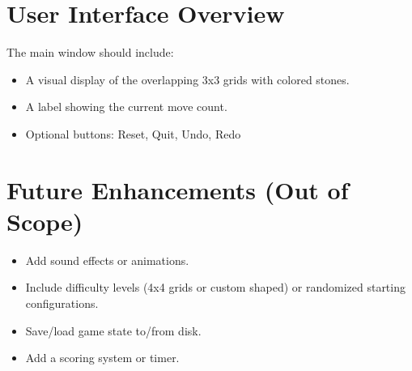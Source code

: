 \documentclass[11.5pt, oneside]{scrartcl}
\begin{document}
	\section{User Interface Overview}
	
	The main window should include:
	\begin{itemize}[noitemsep]
		\item A visual display of the overlapping 3x3 grids with colored stones.
		\item A label showing the current move count.
		\item Optional buttons: Reset, Quit, Undo, Redo
	\end{itemize}
	
	\section{Future Enhancements (Out of Scope)}
	
	\begin{itemize}[noitemsep]
		\item Add sound effects or animations.
		\item Include difficulty levels (4x4 grids or custom shaped) or randomized starting configurations.
		\item Save/load game state to/from disk.
		\item Add a scoring system or timer.
	\end{itemize}
		
\end{document}

